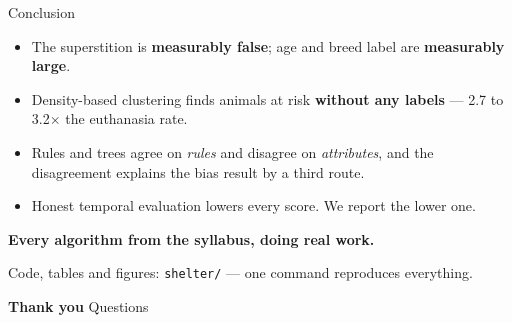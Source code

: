 \documentclass[aspectratio=169,11pt]{beamer}
\newcommand{\punch}[1]{{\color{accent}\textbf{#1}}}
\begin{document}
\begin{frame}{Conclusion}
  \begin{itemize}\itemsep0.7em
    \item The superstition is \textbf{measurably false}; age and breed label are
          \textbf{measurably large}.
    \item Density-based clustering finds animals at risk \textbf{without any
          labels} --- 2.7 to 3.2$\times$ the euthanasia rate.
    \item Rules and trees agree on \emph{rules} and disagree on \emph{attributes},
          and the disagreement explains the bias result by a third route.
    \item Honest temporal evaluation lowers every score. We report the lower one.
  \end{itemize}

  \bigskip
  \centering
  \punch{\large Every algorithm from the syllabus, doing real work.}

  \bigskip
  \footnotesize
  Code, tables and figures: \texttt{shelter/} --- one command reproduces everything.
\end{frame}

\begin{frame}[plain]
  \centering
  \vfill
  {\Huge\color{jiitblue}\textbf{Thank you}}
  \vfill
  \footnotesize Questions
  \vfill
\end{frame}
\end{document}
